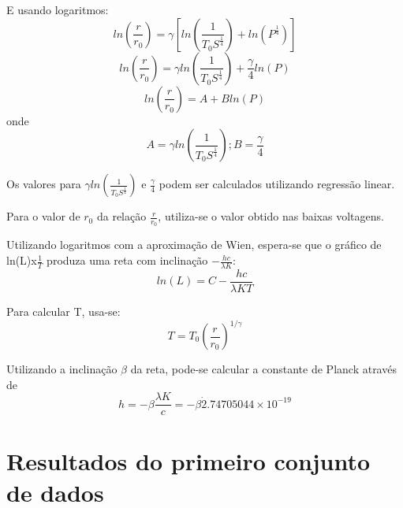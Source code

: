 \documentclass[brazilian,12pt,a4paper,final]{article}
\begin{document}
E usando logaritmos:
$$ln(\frac{r}{r_0})=\gamma[ln(\frac{1}{T_0S^\frac{1}{4}})+ln(P^\frac{1}{4})]$$
$$ln(\frac{r}{r_0})=\gamma ln(\frac{1}{T_0S^\frac{1}{4}})+\frac{\gamma}{4}ln(P)$$
$$ln(\frac{r}{r_0})=A+Bln(P)$$
onde
$$A=\gamma ln(\frac{1}{T_0S^\frac{1}{4}}); B=\frac{\gamma}{4}$$


Os valores para $\gamma ln(\frac{1}{T_0S^\frac{1}{4}})$
e $\frac{\gamma}{4}$ podem ser calculados utilizando regressão linear.

Para o valor de $r_0$ da relação $\frac{r}{r_0}$, utiliza-se o valor obtido 
nas baixas voltagens.

Utilizando logaritmos com a aproximação de Wien, espera-se que 
o gráfico de ln(L)x$\frac{1}{T}$ produza uma reta com inclinação 
$-\frac{hc}{\lambda K}$:
\[
ln(L) =C-\frac{hc}{\lambda KT}
\]

Para calcular T, usa-se:
$$T=T_0(\frac{r}{r_0})^{1/\gamma}$$

Utilizando a inclinação $\beta$ da reta, pode-se calcular a constante de Planck
através de 
\[
h=-\beta \frac{\lambda K}{c}=-\beta \dot 2.74705044 \times 10^{-19}
\]

\section{Resultados do primeiro conjunto de dados}
\end{document}
